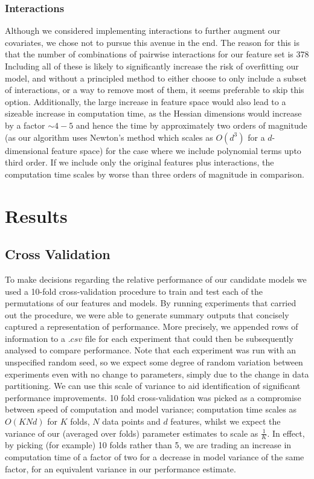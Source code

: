 \subsubsection{Interactions}
Although we considered implementing interactions to further augment our covariates, we chose not to pursue this avenue in the end. The reason for this is that the number of combinations of pairwise interactions for our feature set is 378 Including all of these is likely to significantly increase the risk of overfitting our model, and without a principled method to either choose to only include a subset of interactions, or a way to remove most of them, it seems preferable to skip this option. Additionally, the large increase in feature space would also lead to a sizeable increase in computation time, as the Hessian dimensions would increase by a factor $\sim 4-5$ and hence the time by approximately two orders of magnitude (as our algorithm uses Newton's method which scales as $O(d^3)$ for a $d$-dimensional feature space) for the case where we include polynomial terms upto third order. If we include only the original features plus interactions, the computation time scales by worse than three orders of magnitude in comparison.

\section{Results}
\label{results}

\subsection{Cross Validation}
To make decisions regarding the relative performance of our candidate models we used a 10-fold cross-validation procedure to train and test each of the permutations of our features and models. By running experiments that carried out the procedure, we were able to generate summary outputs that concisely captured a representation of performance. More precisely, we appended rows of information to a $.csv$ file for each experiment that could then be subsequently analysed to compare performance. Note that each experiment was run with an unspecified random seed, so we expect some degree of random variation between experiments even with no change to parameters, simply due to the change in data partitioning. We can use this scale of variance to aid identification of significant performance improvements. 10 fold cross-validation was picked as a compromise between speed of computation and model variance; computation time scales as $O(KNd)$ for $K$ folds, $N$ data points and $d$ features, whilst we expect the variance of our (averaged over folds) parameter estimates to scale as $\frac{1}{K}$. In effect, by picking (for example) 10 folds rather than 5, we are trading an increase in computation time of a factor of two for a decrease in model variance of the same factor, for an equivalent variance in our performance estimate.

